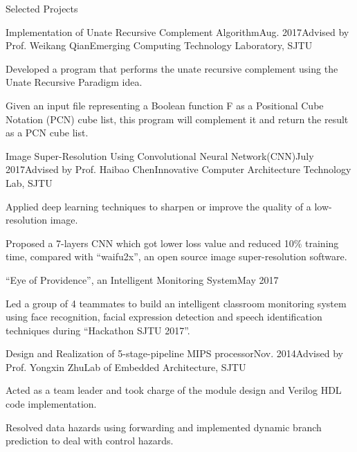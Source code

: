 \documentclass{resume_ucla} %
\begin{document}
\begin{rSection}{Selected Projects}
\begin{rSubsection}{Implementation of Unate Recursive Complement Algorithm}{Aug. 2017}{Advised by Prof. Weikang Qian}{Emerging Computing Technology Laboratory, SJTU}
\item Developed a program that performs the unate recursive complement using the Unate Recursive Paradigm idea.
\item Given an input file representing a Boolean function F as a Positional Cube Notation (PCN) cube list, this program will complement it and return the result as a PCN cube list.
\end{rSubsection}

\begin{comment}
\begin{rSubsection}{Reading Combinational Circuit and Evaluating Its Outputs}{July 2017}{Advised by Prof. Weikang Qian}{Emerging Computing Technology Laboratory, SJTU}
\item Designed a software tool which can read "bench" format file describing a combinational circuit and implemented a topological sorting algorithm to calculate the values for all the primary outputs of the circuits.
\end{rSubsection}
\end{comment}

\begin{rSubsection}{Image Super-Resolution Using Convolutional Neural Network(CNN)}{July 2017}{Advised by Prof. Haibao Chen}{Innovative Computer Architecture Technology Lab, SJTU}
\item Applied deep learning techniques to sharpen or improve the quality of a low-resolution image.
\item Proposed a 7-layers CNN which got lower loss value and reduced 10\% training time, compared with ``waifu2x'', an open source image super-resolution software.
\end{rSubsection}

\begin{rSubsection}{``Eye of Providence'', an Intelligent Monitoring System}{May 2017}{}{}
\item Led a group of 4 teammates to build an intelligent classroom monitoring system using face recognition, facial expression detection and speech identification techniques during ``Hackathon SJTU 2017''.
\end{rSubsection}

\begin{rSubsection}{Design and Realization of 5-stage-pipeline MIPS processor}{Nov. 2014}{Advised by Prof. Yongxin Zhu}{Lab of Embedded Architecture, SJTU}
\item Acted as a team leader and took charge of the module design and Verilog HDL code implementation. 
\item Resolved data hazards using forwarding and implemented dynamic branch prediction to deal with control hazards.
\end{rSubsection}


\end{rSection}
\end{document}
